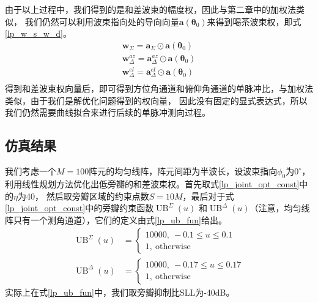 \documentclass[master]{thesis-uestc}
\begin{document}
由于以上过程中，我们得到的是和差波束的幅度权，因此与第二章中的加权法类似，
我们仍然可以利用波束指向处的导向向量$\bm{a}(\bm{\theta}_0)$来得到喝茶波束权，即式\eqref{lp_w_s_w_d}。
\begin{subequations}\label{lp_w_s_w_d}
    \begin{align}
        \bm{w}_\Sigma = \bm{a}_\Sigma \odot \bm{a}(\bm{\theta}_0) \\
        \bm{w}_\Delta^{az} = \bm{a}_\Delta^{az} \odot \bm{a}(\bm{\theta}_0) \\
        \bm{w}_\Delta^{el} = \bm{a}_\Delta^{el} \odot \bm{a}(\bm{\theta}_0) \\
    \end{align}
\end{subequations}
得到和差波束权向量后，即可得到方位角通道和俯仰角通道的单脉冲比，与加权法类似，由于我们是解优化问题得到的权向量，
因此没有固定的显式表达式，所以我们仍然需要曲线拟合来进行后续的单脉冲测向过程。

\subsection{仿真结果}
我们考虑一个$M=100$阵元的均匀线阵，阵元间距为半波长，设波束指向$\phi_0$为$0^\circ$，
利用线性规划方法优化出低旁瓣的和差波束权。首先取式\eqref{lp_joint_opt_const}中的$\eta$为40，
然后取旁瓣区域的约束点数$S=10M$，最后对于式\eqref{lp_joint_opt_const}中的旁瓣约束函数$\operatorname{UB}^\Sigma(u)$
和$\operatorname{UB}^\Delta(u)$（注意，均匀线阵只有一个测角通道），它们的定义由式\eqref{lp_ub_fun}给出。
\begin{subequations}\label{lp_ub_fun}
    \begin{align}
        \operatorname{UB}^\Sigma(u) &= 
        \begin{cases}
            10000, ~ -0.1\leqslant u \leqslant 0.1 \\
            1, ~ \text{otherwise}
        \end{cases} \\
        \operatorname{UB}^\Delta(u) &= 
        \begin{cases}
            10000, ~ -0.17\leqslant u \leqslant 0.17 \\
            1, ~ \text{otherwise}
        \end{cases}
    \end{align}
\end{subequations}
实际上在式\eqref{lp_ub_fun}中，我们取旁瓣抑制比SLL为-40dB。
\end{document}
